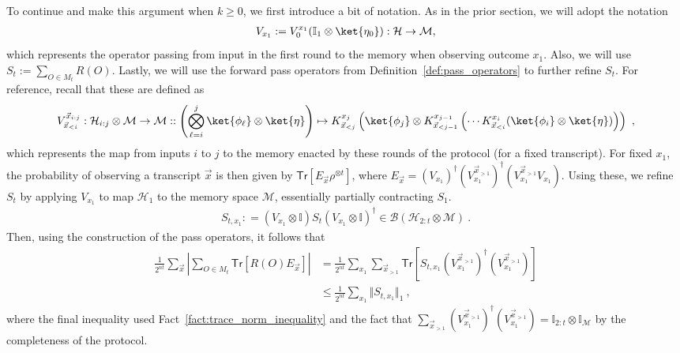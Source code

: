 \documentclass[11pt]{article}
\newcommand{\id}{\ensuremath{\mathbb{I}}}
\newcommand{\Tr}{\mathsf{Tr}}
\newcommand{\Hc}{\mathcal{H}}
\newcommand{\Mc}{\mathcal{M}}
\begin{document}
To continue and make this argument when $k\geq 0$, we first introduce a bit of notation. As in the prior section, we will adopt the notation
    \begin{align}
        V_{x_1} := V_0^{x_1}(\id_1 \otimes \ket{\eta_0}): \Hc\rightarrow\Mc ,
    \end{align}
which represents the operator passing from input in the first round to the memory when observing outcome $x_1$. Also, we will use $S_t := \sum_{O \in M_t}R(O)$. Lastly, we will use the forward pass operators from Definition~\ref{def:pass_operators} to further refine $S_t$. For reference, recall that these are defined as
    \begin{align}
        V_{\vec{x}_{<i}}^{\vec{x}_{i:j}}: \Hc_{i:j}\otimes \Mc\rightarrow \Mc :: \left( \bigotimes_{\ell=i}^j \ket{\phi_\ell}\otimes \ket{\eta} \right) \mapsto K_{\vec{x}_{<j}}^{x_j} \left( \ket{\phi_j}\otimes K_{\vec{x}_{< j-1}}^{x_{j-1}}\left( \cdots K_{\vec{x}_{< i}}^{x_i}(\ket{\phi_i}\otimes \ket{\eta}) \right) \right) \ ,
    \end{align}
    which represents the map from inputs $i$ to $j$ to the memory enacted by these rounds of the protocol (for a fixed transcript). For fixed $x_1$, the probability of observing a transcript $\vec{x}$ is then given by $\Tr[E_{\vec{x}} \rho^{\otimes t}]$, where $E_{\vec{x}} = (V_{x_1})^\dagger (V_{x_1}^{\vec{x}_{>1}})^\dagger (V_{x_1}^{\vec{x}_{>1}} V_{x_1})$. Using these, we refine $S_{t}$ by applying $V_{x_1}$ to map $\Hc_1$ to the memory space $\Mc$, essentially partially contracting $S_1$.
\begin{align}
    S_{t,x_1} : = (V_{x_1}\otimes \id) S_t (V_{x_1}\otimes \id)^\dagger \in \mathcal{B}\left(\Hc_{2:t}\otimes \Mc \right)\ .
\end{align}
Then, using the construction of the pass operators, it follows that
\begin{align}
    \frac{1}{2^{nt}}\sum_{\vec{x}}\left\vert \sum_{O \in M_t}\Tr[R(O)E_{\vec{x}}] \right\vert & = \frac{1}{2^{nt}}\sum_{x_1} \sum_{\vec{x}_{>1}}\Tr[S_{t,x_1} (V_{x_1}^{\vec{x}_{>1}})^\dagger (V_{x_1}^{\vec{x}_{>1}})]\\
    & \leq \frac{1}{2^{nt}} \sum_{x_1}\Vert S_{t,x_1}\Vert_1\ ,\label{eq:st_sum}
\end{align}
where the final inequality used Fact~\ref{fact:trace_norm_inequality} and the fact that $\sum_{\vec{x}_{>1}} (V_{x_1}^{\vec{x}_{>1}})^\dagger (V_{x_1}^{\vec{x}_{>1}}) = \id_{2:t}\otimes \id_{\Mc}$ by  the completeness of the protocol.
\end{document}
